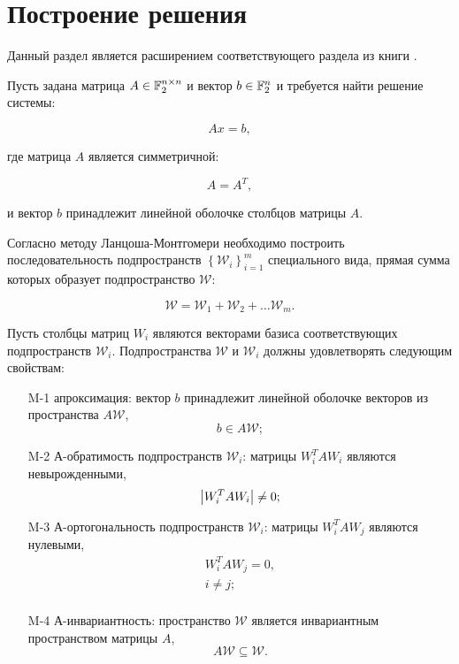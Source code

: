 \section{Построение решения} \label{section:LM:finding_solution}

Данный раздел является расширением соответствующего раздела из книги \cite[с.~44--50]{Zamarashkin}.

Пусть задана матрица $A \in \mathbb{F}^{n \times n}_2$ и вектор $b \in \mathbb{F}^{n}_2$ и требуется найти решение системы:

$$
	Ax = b,
$$

где матрица $A$ является симметричной:

$$
	A = A^T,
$$

и вектор $b$ принадлежит линейной оболочке столбцов матрицы $A$.

Согласно методу Ланцоша-Монтгомери \cite{Montgomery} необходимо построить последовательность подпространств
$ \left \{ \mathcal W_i \right \} _{i=1}^m$ специального вида, прямая сумма которых образует подпространство $\mathcal W$:

$$
	\mathcal W = \mathcal W_1 + \mathcal W_2 + \dots \mathcal W_m.
$$

Пусть столбцы матриц $W_i$ являются векторами базиса соответствующих подпространств $\mathcal W_i$. Подпространства $\mathcal W$
и $\mathcal W_i$ должны удовлетворять следующим свойствам:

\begin{itemize}

	\item [M-1] апроксимация: вектор $b$ принадлежит линейной оболочке векторов из пространства $A \mathcal W$,
		$$
			b \in A \mathcal W;
		$$

	\item [M-2] А-обратимость подпространств $\mathcal W_i$: матрицы $W_i^T A W_i$ являются невырожденными,
		$$
			\left | W_i^T A W_i \right | \neq 0;
		$$

	\item [M-3] А-ортогональность подпространств $\mathcal W_i$: матрицы $W_i^T A W_j$ являются нулевыми,
		$$
			\begin{array}{c}
				W_i^T A W_j = 0, \\
				i \neq j; \\
			\end{array}
		$$

	\item [M-4] А-инвариантность: пространство $\mathcal W$ является инвариантным пространством матрицы $A$,
		$$
			A \mathcal W \subseteq \mathcal W.
		$$
\end{itemize}

